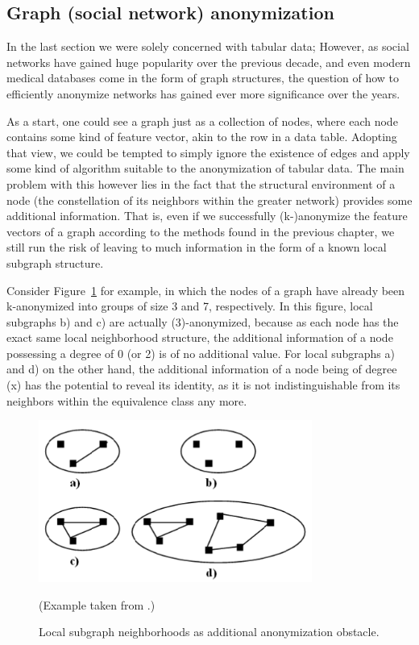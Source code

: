 \documentclass{llncs}
\begin{document}
\subsection{Graph (social network) anonymization}
\label{ssect:graph_sn_anon}

In the last section we were solely concerned with tabular data; However, as social networks have gained huge popularity over the previous decade, and even modern medical databases come in the form of graph structures, the question of how to efficiently anonymize networks has gained ever more significance over the years.

As a start, one could see a graph just as a collection of nodes, where each node contains some kind of feature vector, akin to the row in a data table. Adopting that view, we could be tempted to simply ignore the existence of edges and apply some kind of algorithm suitable to the anonymization of tabular data. The main problem with this however lies in the fact that the structural environment of a node (the constellation of its neighbors within the greater network) provides some additional information. That is, even if we successfully (k-)anonymize the feature vectors of a graph according to the methods found in the previous chapter, we still run the risk of leaving to much information in the form of a known local subgraph structure.

Consider Figure~\ref{fig:anon_sn_problem} for example, in which the nodes of a graph have already been k-anonymized into groups of size 3 and 7, respectively. In this figure, local subgraphs b) and c) are actually (3)-anonymized, because as each node has the exact same local neighborhood structure, the additional information of a node possessing a degree of 0 (or 2) is of no additional value. For local subgraphs a) and d) on the other hand, the additional information of a node being of degree (x) has the potential to reveal its identity, as it is not indistinguishable from its neighbors within the equivalence class any more.

\begin{figure}[!t]
	\begin{center}
		\includegraphics[width=0.8\textwidth]{figures/anonym/sn_problem}
		\caption{Local subgraph neighborhoods as additional anonymization obstacle.}
		\label{fig:anon_sn_problem}
	\end{center}
	\small
	(Example taken from \cite{campan2009data}.)
\end{figure}
\end{document}
